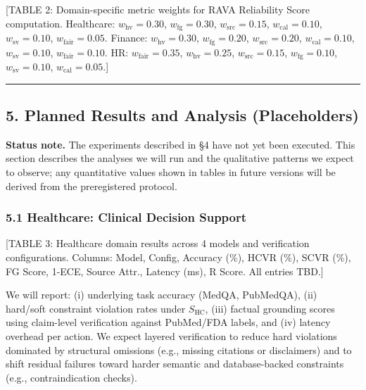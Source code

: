 \documentclass[
]{article}
\begin{document}
{[}TABLE 2: Domain-specific metric weights for RAVA Reliability Score computation. Healthcare: $w_{\text{hv}}=0.30$, $w_{\text{fg}}=0.30$, $w_{\text{src}}=0.15$, $w_{\text{cal}}=0.10$, $w_{\text{sv}}=0.10$, $w_{\text{fair}}=0.05$. Finance: $w_{\text{hv}}=0.30$, $w_{\text{fg}}=0.20$, $w_{\text{src}}=0.20$, $w_{\text{cal}}=0.10$, $w_{\text{sv}}=0.10$, $w_{\text{fair}}=0.10$. HR: $w_{\text{fair}}=0.35$, $w_{\text{hv}}=0.25$, $w_{\text{src}}=0.15$, $w_{\text{fg}}=0.10$, $w_{\text{sv}}=0.10$, $w_{\text{cal}}=0.05$.{]}

\begin{center}\rule{0.5\linewidth}{0.5pt}\end{center}

\hypertarget{5-planned-results-and-analysis-placeholders}{%
\subsection{5. Planned Results and Analysis (Placeholders)}\label{5-planned-results-and-analysis-placeholders}}

\textbf{Status note.} The experiments described in \S{}4 have not yet been executed. This section describes the analyses we will run and the qualitative patterns we expect to observe; any quantitative values shown in tables in future versions will be derived from the preregistered protocol.

\hypertarget{51-healthcare-clinical-decision-support}{%
\subsubsection{5.1 Healthcare: Clinical Decision Support}\label{51-healthcare-clinical-decision-support}}

{[}TABLE 3: Healthcare domain results across 4 models and verification configurations. Columns: Model, Config, Accuracy (\%), HCVR (\%), SCVR (\%), FG Score, 1-ECE, Source Attr., Latency (ms), R Score. All entries TBD.{]}

We will report: (i) underlying task accuracy (MedQA, PubMedQA), (ii) hard/soft constraint violation rates under $S_{\text{HC}}$, (iii) factual grounding scores using claim-level verification against PubMed/FDA labels, and (iv) latency overhead per action. We expect layered verification to reduce hard violations dominated by structural omissions (e.g., missing citations or disclaimers) and to shift residual failures toward harder semantic and database-backed constraints (e.g., contraindication checks).
\end{document}
